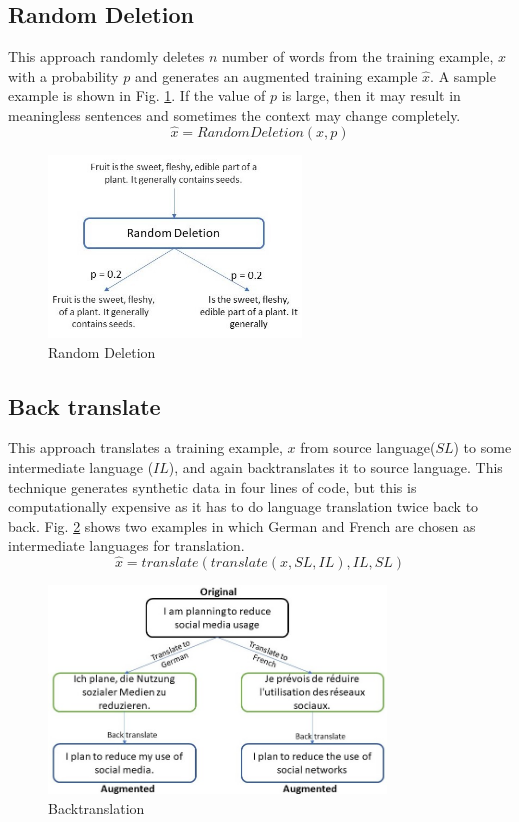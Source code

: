 \documentclass{article}
\begin{document}
\subsection{Random Deletion}
This approach randomly deletes $n$ number of words from the training example, $x$ with a probability $p$ and generates an augmented training example $\hat{x}$. A sample example is shown in Fig. \ref{fig:randomdelete}. If the value of $p$ is large, then it may result in meaningless sentences and sometimes the context may change completely.
\begin{equation}
\hat{x} = RandomDeletion(x, p)
\end{equation}
\begin{figure}[h!]
\centering
  \includegraphics[width=0.6\textwidth]{randomdelete.jpg}
  \caption{Random Deletion}
  \label{fig:randomdelete}
\end{figure}


\subsection{Back translate}
This approach translates a training example, $x$ from source language($SL$) to some intermediate language ($IL$), and again backtranslates it to source language. This technique generates synthetic data in four lines of code, but this is computationally expensive as it has to do language translation twice back to back. Fig. \ref{fig:backtranslate} shows two examples in which German and French are chosen as intermediate languages for translation.
\begin{equation}
\hat{x} = translate( translate(x, SL, IL), IL, SL)
\end{equation}
\begin{figure}[h!]
\centering
  \includegraphics[width=0.8\textwidth]{backtranslate.jpg}
  \caption{Backtranslation}
  \label{fig:backtranslate}
\end{figure}
\end{document}
